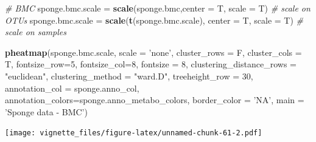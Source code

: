 \documentclass[]{book}
\newenvironment{Shaded}{\begin{snugshade}}{\end{snugshade}}
\newcommand{\KeywordTok}[1]{\textcolor[rgb]{0.13,0.29,0.53}{\textbf{#1}}}
\newcommand{\DataTypeTok}[1]{\textcolor[rgb]{0.13,0.29,0.53}{#1}}
\newcommand{\DecValTok}[1]{\textcolor[rgb]{0.00,0.00,0.81}{#1}}
\newcommand{\StringTok}[1]{\textcolor[rgb]{0.31,0.60,0.02}{#1}}
\newcommand{\CommentTok}[1]{\textcolor[rgb]{0.56,0.35,0.01}{\textit{#1}}}
\newcommand{\NormalTok}[1]{#1}
\begin{document}
\begin{Shaded}
\begin{Highlighting}[]
\CommentTok{# BMC }
\NormalTok{sponge.bmc.scale =}\StringTok{ }\KeywordTok{scale}\NormalTok{(sponge.bmc,}\DataTypeTok{center =}\NormalTok{ T, }\DataTypeTok{scale =}\NormalTok{ T) }\CommentTok{# scale on OTUs}
\NormalTok{sponge.bmc.scale =}\StringTok{ }\KeywordTok{scale}\NormalTok{(}\KeywordTok{t}\NormalTok{(sponge.bmc.scale), }\DataTypeTok{center =}\NormalTok{ T, }\DataTypeTok{scale =}\NormalTok{ T) }\CommentTok{# scale on samples}

\KeywordTok{pheatmap}\NormalTok{(sponge.bmc.scale, }
         \DataTypeTok{scale =} \StringTok{'none'}\NormalTok{, }
         \DataTypeTok{cluster_rows =}\NormalTok{ F, }
         \DataTypeTok{cluster_cols =}\NormalTok{ T, }
         \DataTypeTok{fontsize_row=}\DecValTok{5}\NormalTok{, }\DataTypeTok{fontsize_col=}\DecValTok{8}\NormalTok{,}
         \DataTypeTok{fontsize =} \DecValTok{8}\NormalTok{,}
         \DataTypeTok{clustering_distance_rows =} \StringTok{"euclidean"}\NormalTok{,}
         \DataTypeTok{clustering_method =} \StringTok{"ward.D"}\NormalTok{,}
         \DataTypeTok{treeheight_row =} \DecValTok{30}\NormalTok{,}
         \DataTypeTok{annotation_col =}\NormalTok{ sponge.anno_col,}
         \DataTypeTok{annotation_colors=}\NormalTok{sponge.anno_metabo_colors,}
         \DataTypeTok{border_color =} \StringTok{'NA'}\NormalTok{,}
         \DataTypeTok{main =} \StringTok{'Sponge data - BMC'}\NormalTok{)}
\end{Highlighting}
\end{Shaded}

\texttt{[image: vignette\_files/figure-latex/unnamed-chunk-61-2.pdf]}
\end{document}
